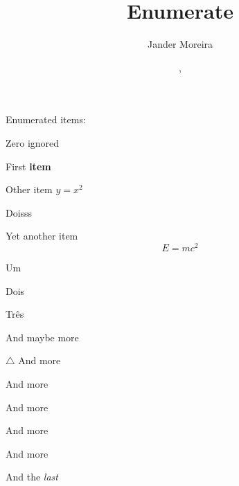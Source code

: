 \documentclass[12pt]{article}
\title{Enumerate}
\author{Jander Moreira}
\date{\monthname, \the\year}
\begin{document}
\maketitle

Enumerated items:
%
%
%
%
%


    \begin{eenumerate}[palette = rgb, itemize = ]
    Zero ignored
    \item First \textbf{item}
    \item Other item $y = x^2$
        \begin{eenumerate}
            \item Doisss
        \end{eenumerate}
    \item Yet another item
        \begin{equation}
            E = mc^2
        \end{equation}
     \begin{eenumerate}
         \item Um
         \item Dois
         \item Três
     \end{eenumerate}
    \item And maybe more
    \item [$\triangle$]And more
    \item And more
    \item And more
    \item And more
    \item And more
    \item And the \textit{last}
\end{eenumerate}
\end{document}
